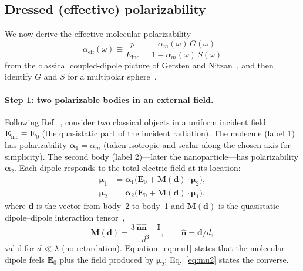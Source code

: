 \documentclass[11pt,a4paper]{article}
\begin{document}
\subsection{Dressed (effective) polarizability}
\label{sec:alphaeff-deriv}

We now derive the effective molecular polarizability
\begin{equation}
  \alpha_{\mathrm{eff}}(\omega)
  \equiv
  \frac{p}{E_{\mathrm{inc}}}
  =
  \frac{\alpha_m(\omega)\, G(\omega)}{1 - \alpha_m(\omega)\, S(\omega)}
  \label{eq:alphaeff}
\end{equation}
from the classical coupled-dipole picture of Gersten and Nitzan~\citep{gersten1980},
and then identify $G$ and $S$ for a multipolar sphere~\citep{gersten1981,bohren1983}.

\paragraph{Step 1: two polarizable bodies in an external field.}
Following Ref.~, consider two classical objects in a uniform
incident field $\mathbf{E}_{\mathrm{inc}}\equiv\mathbf{E}_0$ (the quasistatic part of the
incident radiation).  The molecule (label 1) has polarizability $\boldsymbol{\alpha}_1=\alpha_m$
(taken isotropic and scalar along the chosen axis for simplicity).  The second body
(label 2)---later the nanoparticle---has polarizability $\boldsymbol{\alpha}_2$.
Each dipole responds to the total electric field at its location:
\begin{align}
  \boldsymbol{\mu}_1
  &=
  \boldsymbol{\alpha}_1
  \bigl(
    \mathbf{E}_0
    +
    \mathbf{M}(\mathbf{d})\cdot\boldsymbol{\mu}_2
  \bigr),
  \label{eq:mu1} \\[0.35em]
  \boldsymbol{\mu}_2
  &=
  \boldsymbol{\alpha}_2
  \bigl(
    \mathbf{E}_0
    +
    \mathbf{M}(\mathbf{d})\cdot\boldsymbol{\mu}_1
  \bigr),
  \label{eq:mu2}
\end{align}
where $\mathbf{d}$ is the vector from body~2 to body~1 and $\mathbf{M}(\mathbf{d})$ is the
quasistatic dipole--dipole interaction tensor~\citep{jackson1999,gersten1980},
\begin{equation}
  \mathbf{M}(\mathbf{d})
  =
  \frac{3\,\hat{\mathbf{n}}\hat{\mathbf{n}}-\mathbf{I}}{d^3},
  \qquad
  \hat{\mathbf{n}}=\mathbf{d}/d,
  \label{eq:Mtensor}
\end{equation}
valid for $d\ll\lambda$ (no retardation).  Equation~\eqref{eq:mu1} states that the
molecular dipole feels $\mathbf{E}_0$ plus the field produced by $\boldsymbol{\mu}_2$;
Eq.~\eqref{eq:mu2} states the converse.
\end{document}

